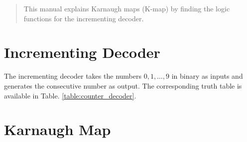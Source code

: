 \documentclass[journal,12pt,twocolumn]{IEEEtran}
\begin{document}
% 







\maketitle

\tableofcontents

\bigskip

\renewcommand{\thefigure}{\theenumi}
\renewcommand{\thetable}{\theenumi}

\begin{abstract}
This manual explains Karnaugh maps (K-map) by finding the
logic functions for the incrementing decoder.
\end{abstract}

%
\section{Incrementing Decoder}
The incrementing decoder   takes the numbers $0,1,\dots,9$ in binary as inputs and generates
the consecutive number as output.  The corresponding truth table is available in Table. \ref{table:counter_decoder}.

\section{Karnaugh Map}
\end{document}
